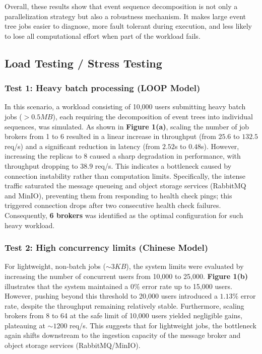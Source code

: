 Overall, these results show that event sequence decomposition is not only a parallelization strategy but also a robustness mechanism. It makes large event tree jobs easier to diagnose, more fault tolerant during execution, and less likely to lose all computational effort when part of the workload fails.

\subsection{Load Testing / Stress Testing}



\subsubsection{Test 1: Heavy batch processing (LOOP Model)}
In this scenario, a workload consisting of 10,000 users submitting heavy batch jobs ($>0.5MB$), each requiring the decomposition of event trees into individual sequences, was simulated. As shown in \textbf{Figure 1(a)}, scaling the number of job brokers from 1 to 6 resulted in a linear increase in throughput (from $25.6$ to $132.5$ req/s) and a significant reduction in latency (from $2.52$s to $0.48$s). However, increasing the replicas to 8 caused a sharp degradation in performance, with throughput dropping to $38.9$ req/s. This indicates a bottleneck caused by connection instability rather than computation limits. Specifically, the intense traffic saturated the message queueing and object storage services (RabbitMQ and MinIO), preventing them from responding to health check pings; this triggered connection drops after two consecutive health check failures. Consequently, \textbf{6 brokers} was identified as the optimal configuration for such heavy workload.

\subsubsection{Test 2: High concurrency limits (Chinese Model)}
For lightweight, non-batch jobs ($\sim 3KB$), the system limits were evaluated by increasing the number of concurrent users from 10,000 to 25,000. \textbf{Figure 1(b)} illustrates that the system maintained a $0\%$ error rate up to 15,000 users. However, pushing beyond this threshold to 20,000 users introduced a $1.13\%$ error rate, despite the throughput remaining relatively stable. Furthermore, scaling brokers from 8 to 64 at the safe limit of 10,000 users yielded negligible gains, plateauing at $\sim1200$ req/s. This suggests that for lightweight jobs, the bottleneck again shifts downstream to the ingestion capacity of the message broker and object storage services (RabbitMQ/MinIO).


